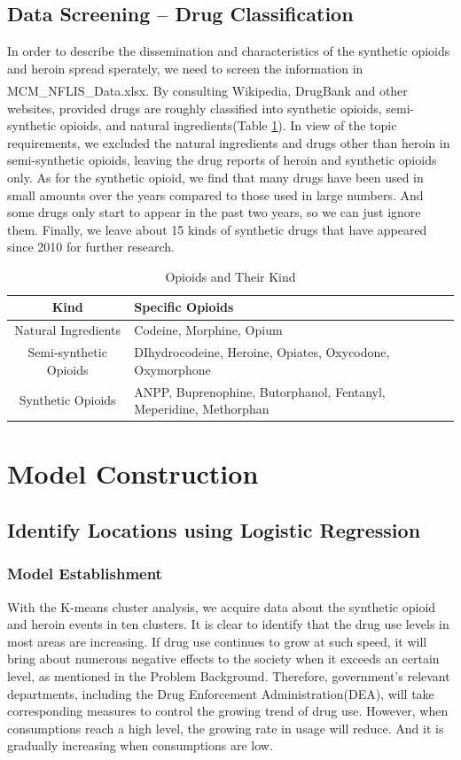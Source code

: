 \documentclass[11pt]{article}
\newcommand{\upcite}[1]{\textsuperscript{\textsuperscript{\cite{#1}}}}
\begin{document}
\subsection{Data Screening -- Drug Classification}
In order to describe the dissemination and characteristics of the synthetic opioids and heroin spread sperately, we need to screen the information in MCM\_NFLIS\_Data.xlsx. By consulting Wikipedia, DrugBank\upcite{4} and other websites, provided drugs are roughly classified into synthetic opioids, semi-synthetic opioids, and natural ingredients(Table \ref{opioid kind}). In view of the topic requirements, we excluded the natural ingredients and drugs other than heroin in semi-synthetic opioids, leaving the drug reports of heroin and synthetic opioids only. As for the synthetic opioid, we find that many drugs have been used in small amounts over the years compared to those used in large numbers. And some drugs only start to appear in the past two years, so we can just ignore them. Finally, we leave about 15 kinds of synthetic drugs that have appeared since 2010 for further research.
\begin{table}[H]
	\centering
	\caption{Opioids and Their Kind}
	\begin{tabular}{c|l}
	\hline
	Kind & Specific Opioids\\
	\hline
	Natural Ingredients	& Codeine, Morphine, Opium \\
	\hline
	Semi-synthetic Opioids & DIhydrocodeine, Heroine, Opiates, Oxycodone, Oxymorphone\\
	\hline
	Synthetic Opioids &  ANPP, Buprenophine, Butorphanol, Fentanyl, Meperidine, Methorphan\\
	\hline
	\end{tabular}
	\label{opioid kind}
\end{table}

\section{Model Construction}
\subsection{Identify Locations using Logistic Regression}
\subsubsection{Model Establishment}
With the K-means cluster analysis, we acquire data about the synthetic opioid and heroin events in ten clusters. It is clear to identify that the drug use levels in most areas are increasing. If drug use continues to grow at such speed, it will bring about numerous negative effects to the society when it exceeds an certain level, as mentioned in the Problem Background. Therefore, government’s relevant departments, including the Drug Enforcement Administration(DEA), will take corresponding measures to control the growing trend of drug use. However, when consumptions reach a high level, the growing rate in usage will reduce. And it is gradually increasing when consumptions are low.
\end{document}
